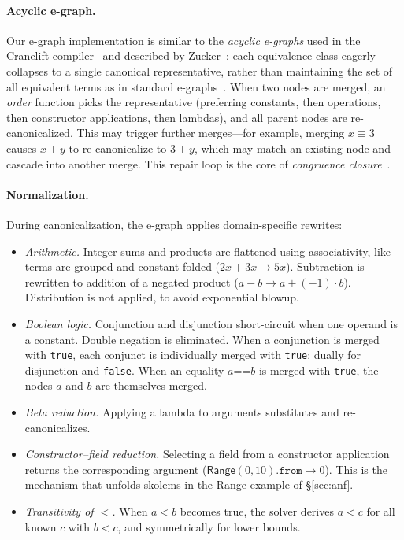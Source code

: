 \documentclass[acmsmall]{acmart}
\begin{document}
\paragraph{Acyclic e-graph.}
Our e-graph implementation is similar to the \emph{acyclic e-graphs} used in the Cranelift compiler~\cite{cranelift} and described by Zucker~\cite{zucker2024}: each equivalence class eagerly collapses to a single canonical representative, rather than maintaining the set of all equivalent terms as in standard e-graphs~\cite{willsey2021}. When two nodes are merged, an \emph{order} function picks the representative (preferring constants, then operations, then constructor applications, then lambdas), and all parent nodes are re-canonicalized. This may trigger further merges---for example, merging $x \equiv 3$ causes $x + y$ to re-canonicalize to $3 + y$, which may match an existing node and cascade into another merge. This repair loop is the core of \emph{congruence closure}~\cite{nelson1980}.

\paragraph{Normalization.}
During canonicalization, the e-graph applies domain-specific rewrites:
%
\begin{itemize}
  \item \emph{Arithmetic.} Integer sums and products are flattened using associativity, like-terms are grouped and constant-folded ($2x + 3x \to 5x$). Subtraction is rewritten to addition of a negated product ($a - b \to a + (-1) \cdot b$). Distribution is not applied, to avoid exponential blowup.
  \item \emph{Boolean logic.} Conjunction and disjunction short-circuit when one operand is a constant. Double negation is eliminated. When a conjunction is merged with \lstinline!true!, each conjunct is individually merged with \lstinline!true!; dually for disjunction and \lstinline!false!. When an equality $a \mathbin{\texttt{==}} b$ is merged with \lstinline!true!, the nodes $a$ and $b$ are themselves merged.
  \item \emph{Beta reduction.} Applying a lambda to arguments substitutes and re-canonicalizes.
  \item \emph{Constructor--field reduction.} Selecting a field from a constructor application returns the corresponding argument ($\mathsf{Range}(0, 10).\mathtt{from} \to 0$). This is the mechanism that unfolds skolems in the Range example of \S\ref{sec:anf}.
  \item \emph{Transitivity of $<$.} When $a < b$ becomes true, the solver derives $a < c$ for all known $c$ with $b < c$, and symmetrically for lower bounds.
\end{itemize}
\end{document}
